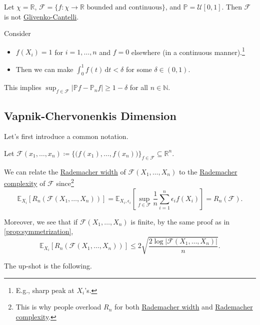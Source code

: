 \begin{eg}
	Let \(\chi = \mathbb{R} \), \(\mathscr{F} = \{ f\colon \chi \to \mathbb{R} \text{ bounded and continuous}\} \), and \(\mathbb{P} = \mathcal{U} [0, 1]\). Then \(\mathscr{F} \) is not \hyperref[def:Glivenko-Cantelli]{Glivenko-Cantelli}.
\end{eg}
\begin{explanation}
	Consider
	\begin{itemize}
		\item \(f(X_i) = 1\) for \(i = 1, \dots , n\) and \(f = 0\) elsewhere (in a continuous manner).\footnote{E.g., sharp peak at \(X_i\)'s.}
		\item Then we can make \(\int_{0}^{1} f(t) \,\mathrm{d}t < \delta \) for some \(\delta \in (0, 1)\).
	\end{itemize}
	This implies \(\sup _{f\in \mathscr{F} } \vert \mathbb{P} f - \mathbb{P} _n f \vert \geq 1 - \delta  \) for all \(n \in \mathbb{N} \).
\end{explanation}

\subsection{Vapnik-Chervonenkis Dimension}
Let's first introduce a common notation.

\begin{notation}
	Let \(\mathscr{F} (x_1, \dots , x_n) \coloneqq \{ \big(f(x_1), \dots , f(x_n)\big) \} _{f\in \mathscr{F} } \subseteq \mathbb{R} ^n\).
\end{notation}

We can relate the \hyperref[def:Rademacher-width]{Rademacher width} of \(\mathscr{F} (X_1, \dots , X_n)\) to the \hyperref[def:Rademacher-complexity]{Rademacher complexity} of \(\mathscr{F} \) since\footnote{This is why people overload \(R_n\) for both \hyperref[def:Rademacher-width]{Rademacher width} and \hyperref[def:Rademacher-complexity]{Rademacher complexity}.}
\[
	\mathbb{E}_{X_i}\left[R_n( \mathscr{F} (X_1, \dots , X_n)) \right]
	= \mathbb{E}_{X_i, \epsilon _i}\left[ \sup _{f\in \mathscr{F} }\frac{1}{n}\sum_{i=1}^{n} \epsilon _i f(X_i) \right]
	= R_n(\mathscr{F} ).
\]

Moreover, we see that if \(\mathscr{F} (X_1, \dots , X_n)\) is finite, by the same proof as in \autoref{prop:symmetrization},
\[
	\mathbb{E}_{X_i}\left[R_n(\mathscr{F} (X_1, \dots , X_n)) \right]
	\leq 2 \sqrt{\frac{2 \log \vert \mathscr{F} (X_1, \dots , X_n) \vert }{n}} .
\]

The up-shot is the following.

